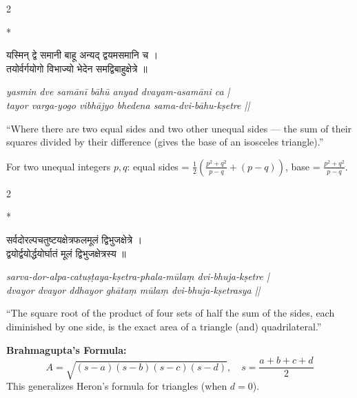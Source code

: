 \documentclass[11pt,a4paper]{article}
\newcommand{\dev}[1]{{\devanagarifont #1}}
\theoremstyle{definition}
\begin{document}
\begin{paracol}{2}

\switchcolumn[0]*\noindent
\begin{tcolorbox}[colback=sktbg,colframe=vertrule,boxrule=0.5pt,arc=3pt,title={\small\bfseries\dev{समद्विबाहुक्षेत्र}} (Isosceles Triangle)]
\dev{यस्मिन् द्वे समानी बाहू अन्यद् द्वयमसमानि च ।\\
तयोर्वर्गयोगो विभाज्यो भेदेन समद्विबाहुक्षेत्रे ॥}
\end{tcolorbox}

\switchcolumn\noindent
\begin{tcolorbox}[colback=transbg,colframe=vertrule!60,boxrule=0.5pt,arc=3pt,title={\small\bfseries Isosceles Triangle with Integral Sides}]
\textit{yasmin dve sam\=an\={i} b\=ah\=u anyad dvayam-asam\=ani ca |\\
tayor varga-yogo vibh\=ajyo bhedena sama-dvi-b\=ahu-k\d{s}etre ||}

``Where there are two equal sides and two other unequal sides --- the sum of their squares divided by their difference (gives the base of an isosceles triangle).''

For two unequal integers $p, q$: equal sides = $\frac{1}{2}\!\left(\frac{p^2+q^2}{p-q} + (p-q)\right)$, base = $\frac{p^2+q^2}{p-q}$.
\end{tcolorbox}

\end{paracol}

\vspace{0.3cm}

\begin{paracol}{2}

\switchcolumn[0]*\noindent
\begin{tcolorbox}[colback=sktbg,colframe=vertrule,boxrule=0.5pt,arc=3pt,title={\small\bfseries\dev{चतुर्भुजक्षेत्र}} (Cyclic Quadrilateral)]
\dev{सर्वदोरल्पचतुष्टयक्षेत्रफलमूलं द्विभुजक्षेत्रे ।\\
द्वयोर्द्वयोर्द्धयोर्घातं मूलं द्विभुजक्षेत्रस्य ॥}
\end{tcolorbox}

\switchcolumn\noindent
\begin{tcolorbox}[colback=transbg,colframe=vertrule!60,boxrule=0.5pt,arc=3pt,title={\small\bfseries Area of Cyclic Quadrilateral}]
\textit{sarva-dor-alpa-catu\d{s}\d{t}aya-k\d{s}etra-phala-m\=ula\d{m} dvi-bhuja-k\d{s}etre |\\
dvayor dvayor ddhayor gh\=ata\d{m} m\=ula\d{m} dvi-bhuja-k\d{s}etrasya ||}

``The square root of the product of four sets of half the sum of the sides, each diminished by one side, is the exact area of a triangle (and) quadrilateral.''

\textbf{Brahmagupta's Formula:}
\[
A = \sqrt{(s-a)(s-b)(s-c)(s-d)}, \quad s = \frac{a+b+c+d}{2}
\]
This generalizes Heron's formula for triangles (when $d = 0$).
\end{tcolorbox}

\end{paracol}
\end{document}
